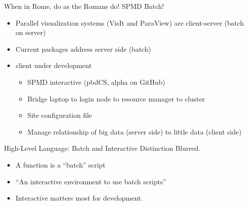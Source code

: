 \begin{frame}
  \begin{block}{When in Rome, do as the Romans do! \hfill SPMD Batch!}
    \begin{itemize}
    \item Parallel visualization systems (VisIt and ParaView) are
      client-server (batch on server)
    \item Current \pbdR packages address server side (batch)
    \item \pbdR client under development
      \begin{itemize}
      \item SPMD interactive (pbdCS, alpha on GitHub)
      \item Bridge laptop to login node to resource manager to cluster
      \item Site configuration file
      \item Manage relationship of big data (server side) to little
        data (client side)
      \end{itemize}
    \end{itemize}
  \end{block}
  \begin{block}{High-Level Language: Batch and Interactive Distinction Blurred.}
    \begin{itemize}
    \item A function is a ``batch'' script
    \item \R ``An interactive environment to use batch scripts''
    \item Interactive matters most for development.
    \end{itemize}
  \end{block}
\end{frame}
